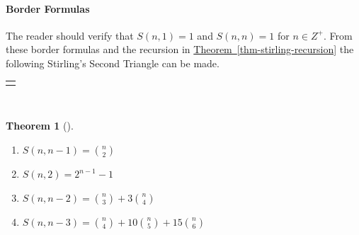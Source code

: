\documentclass[10pt,]{book}
\theoremstyle{plain}
\newtheorem{theorem}{Theorem}[section]
\theoremstyle{definition}
\theoremstyle{definition}
\numberwithin{equation}{chapter}
\newlength{\panelmax}
\begin{document}
\paragraph[{Border Formulas}]{Border Formulas}\hypertarget{paragraphs-8}{}
\hypertarget{p-114}{}%
The reader should verify that \(S(n,1) = 1\) and \(S(n,n) = 1\) for \(n \in Z^{+}\). From these border formulas and the recursion in \hyperref[thm-stirling-recursion]{Theorem~\ref{thm-stirling-recursion}} the following Stirling's Second Triangle can be made.%
{%
\setlength{\panelmax}{0pt}
\ifdefined\panelboxAtabular\else\newsavebox{\panelboxAtabular}\fi%
\ifdefined\phAtabular\else\newlength{\phAtabular}\fi%
\setlength{\phAtabular}{\ht\panelboxAtabular+\dp\panelboxAtabular}
\settototalheight{\phAtabular}{\usebox{\panelboxAtabular}}
\setlength{\panelmax}{\maxof{\panelmax}{\phAtabular}}
\leavevmode%
\setlength{\tabcolsep}{0\linewidth}
\par\medskip\noindent
\hspace*{0.25\linewidth}%
\begin{tabular}{@{}*{1}{c}@{}}
\begin{minipage}[c][\panelmax][t]{0.5\linewidth}\usebox{\panelboxAtabular}\end{minipage}\end{tabular}\\
}%
\begin{theorem}[{}]\label{thm-stirling-border}
\hypertarget{p-115}{}%
\leavevmode%
\begin{enumerate}
\item\hypertarget{li-18}{}\hypertarget{p-116}{}%
\(S\left( n,n - 1 \right) =\binom{n}{2}\)%
\item\hypertarget{li-19}{}\hypertarget{p-117}{}%
\(S\left( n,2 \right) = 2^{n - 1} - 1\)%
\item\hypertarget{li-20}{}\hypertarget{p-118}{}%
\(S\left( n,n - 2 \right) =\binom{n}{3}
+ 3\binom{n}{4}\)%
\item\hypertarget{li-21}{}\hypertarget{p-119}{}%
\(S\left( n,n - 3 \right) =\binom{n}{4}
+ 10\binom{n}{5}
+ 15\binom{n}{6}\)%
\end{enumerate}
%
\end{theorem}
\end{document}
